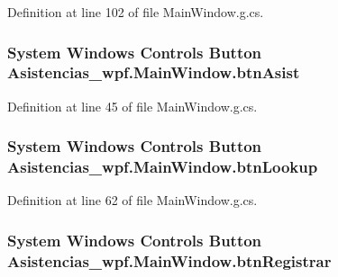 Definition at line 102 of file Main\-Window.\-g.\-cs.

\hypertarget{class_asistencias__wpf_1_1_main_window_a65c34d321ad5d831ae14e80205d153b8}{
\subsubsection[{btn\-Asist}]{\setlength{\rightskip}{0pt plus 5cm}System Windows Controls Button Asistencias\-\_\-wpf.\-Main\-Window.\-btn\-Asist\hspace{0.3cm}{\ttfamily [package]}}}\label{class_asistencias__wpf_1_1_main_window_a65c34d321ad5d831ae14e80205d153b8}


Definition at line 45 of file Main\-Window.\-g.\-cs.

\hypertarget{class_asistencias__wpf_1_1_main_window_a06d0d015783f1332649608fd2a84d459}{
\subsubsection[{btn\-Lookup}]{\setlength{\rightskip}{0pt plus 5cm}System Windows Controls Button Asistencias\-\_\-wpf.\-Main\-Window.\-btn\-Lookup\hspace{0.3cm}{\ttfamily [package]}}}\label{class_asistencias__wpf_1_1_main_window_a06d0d015783f1332649608fd2a84d459}


Definition at line 62 of file Main\-Window.\-g.\-cs.

\hypertarget{class_asistencias__wpf_1_1_main_window_a37ce519d4dc242993a180c9ec48581f6}{
\subsubsection[{btn\-Registrar}]{\setlength{\rightskip}{0pt plus 5cm}System Windows Controls Button Asistencias\-\_\-wpf.\-Main\-Window.\-btn\-Registrar\hspace{0.3cm}{\ttfamily [package]}}}\label{class_asistencias__wpf_1_1_main_window_a37ce519d4dc242993a180c9ec48581f6}


